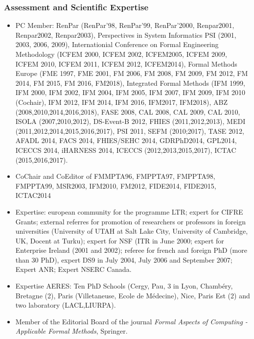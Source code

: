\documentclass[ 12pt]{article}
\begin{document}
\subsubsection{Assessment and Scientific Expertise} 


\begin{itemize}
\item PC Member:  RenPar (RenPar'98,
  RenPar'99, RenPar'2000,   Renpar2001,     Renpar2002,   Renpar2003),
  Perspectives  in System  Informatics  PSI (2001,  2003, 2006, 2009),
  Internationial Conference  on  Formal Engineering Methodology (ICFEM
  2000,  ICFEM  2002, ICFEM2005,  ICFEM  2009, ICFEM 2010, ICFEM 2011,
  ICFEM 2012,  ICFEM2014), Formal Methods Europe  (FME 1997, FME 2001,
  FM 2006, FM 2008,  FM  2009, FM 2012, FM   2014, FM 2015,  FM 2016, FM2018),
  Integrated Formal Methods (IFM 1999, IFM 2000, IFM 2002, IFM 2004, IFM
  2005,  IFM 2007, IFM  2009, IFM 2010 (Cochair),  IFM 2012, IFM 2014,
  IFM 2016, IFM2017, IFM2018),  ABZ (2008,2010,2014,2016,2018), FASE 2008, CAL 2008,
  CAL 2009, CAL  2010, ISOLA (2007,2010,2012),  DS-Event-B 2012, FHIES
  (2011,2012,2013),  MEDI   (2011,2012,2014,2015,2016,2017), PSI 2011,
  SEFM (2010;2017), TASE 2012, AFADL 2014, FACS 2014, FHIES/SEHC 2014,
  GDRPhD2014,   GPL2014,   ICECCS   2014,    iHARNESS   2014,   ICECCS
  (2012,2013,2015,2017), ICTAC (2015,2016,2017).

\item CoChair and CoEditor of FMMPTA96, FMPPTA97, FMPPTA98, FMPPTA99, MSR2003, 
IFM2010, FM2012, FIDE2014, FIDE2015, ICTAC2014
\item Expertise: european community for  the programme LTR; expert for
  CIFRE   Grants; external referres  for  promotion  of researchers or
  professors in foreign universities  (University of UTAH at Salt Lake
  City, University of Cambridge, UK, Docent at  Turku); expert for NSF
  (ITR in June  2000; expert for Enterprise  Ireland (2001 and  2002);
  referee for french and foreign PhD (more than 30 PhD), expert DS9 in
  July  2004, July 2006 and  September  2007; Expert ANR; Expert NSERC
  Canada.


\item Expertise  AERES: Ten PhD Schools (Cergy, Pau,  3 in  Lyon, Chamb\'ery, Bretagne (2), Paris (Villetaneuse,   Ecole de M\'edecine), Nice, Paris Est (2) and two laboratory (LACL,LIURPA). 



\item Member of the Editorial Board of the journal \textit{Formal Aspects of Computing - 
Applicable Formal Methods}, Springer.

\end{itemize}
\end{document}
